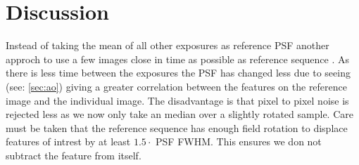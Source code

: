 \chapter{Discussion}

Instead of taking the mean of all other exposures as reference \ac{PSF} another approch to use a few images close in time as possible as reference sequence \cite{Marois_2006}. As there is less time between the exposures the \ac{PSF} has changed less due to seeing  (see: \autoref{sec:ao}) giving a greater correlation between the features on the reference image and the individual image. The disadvantage is that pixel to pixel noise is rejected less as we now only take an median over a slightly rotated sample. Care must be taken that the reference sequence has enough field rotation to displace features of intrest by at least $1.5 \cdot$ \ac{PSF} \ac{FWHM}. This ensures we don not subtract the feature from itself. 

